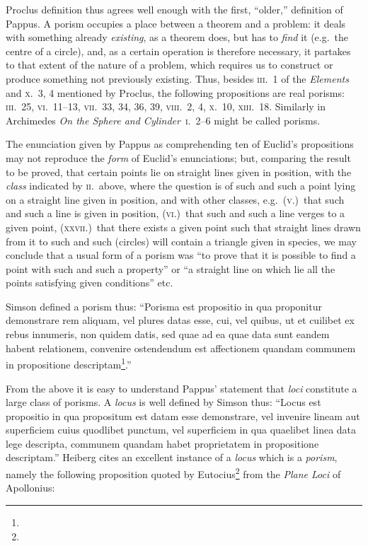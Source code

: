 Proclus definition thus agrees well enough with the first, ``older,'' definition of Pappus. A porism occupies a place between a theorem and a problem: it deals with something already \emph{existing}, as a theorem does, but has to \emph{find} it (e.g.~the centre of a circle), and, as a certain operation is therefore necessary, it partakes to that extent of the nature of a problem, which requires us to construct or produce something not previously existing. Thus, besides \textsc{iii.}~1 of the \emph{Elements} and \textsc{x.}~3, 4 mentioned by Proclus, the following propositions are real porisms: \textsc{iii.}~25, \textsc{vi.}~11--13, \textsc{vii.}~33, 34, 36, 39, \textsc{viii.}~2, 4, \textsc{x.}~10, \textsc{xiii.}~18. Similarly in Archimedes \emph{On the Sphere and Cylinder}~\textsc{i.}~2--6 might be called porisms.

The enunciation given by Pappus as comprehending ten of Euclid's propositions may not reproduce the \emph{form} of Euclid's enunciations; but, comparing the result to be proved, that certain points lie on straight lines given in position, with the \emph{class} indicated by \textsc{ii.}\ above, where the question is of such and such a point lying on a straight line given in position, and with other classes, e.g.\ (\textsc{v.})\ that such and such a line is given in position, (\textsc{vi.})\ that such and such a line verges to a given point, (\textsc{xxvii.})\ that there exists a given point such that straight lines drawn from it to such and such (circles) will contain a triangle given in species, we may conclude that a usual form of a porism was ``to prove that it is possible to find a point with such and such a property'' or ``a straight line on which lie all the points satisfying given conditions'' etc.

Simson defined a porism thus: ``Porisma est propositio in qua proponitur demonstrare rem aliquam, vel plures datas esse, cui, vel quibus, ut et cuilibet ex rebus innumeris, non quidem datis, sed quae ad ea quae data sunt eandem habent relationem, convenire ostendendum est affectionem quandam communem in propositione descriptam\footnote{}.''

From the above it is easy to understand Pappus' statement that \emph{loci} constitute a large class of porisms. A \emph{locus} is well defined by Simson thus: ``Locus est propositio in qua propositum est datam esse demonstrare, vel invenire lineam aut superficiem cuius quodlibet punctum, vel superficiem in qua quaelibet linea data lege descripta, communem quandam habet proprietatem in propositione descriptam.'' Heiberg cites an excellent instance of a \emph{locus} which is a \emph{porism}, namely the following proposition quoted by Eutocius\footnote{} from the \emph{Plane Loci} of Apollonius:

